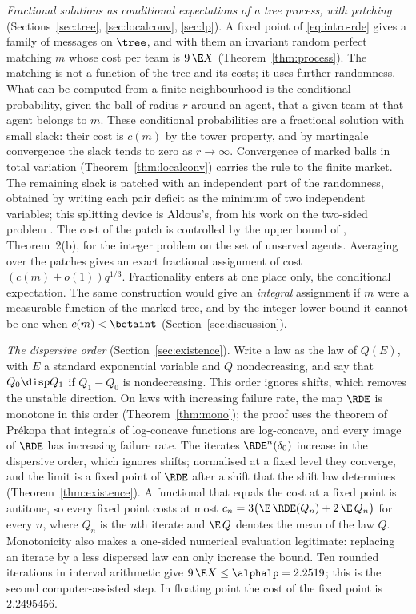 \emph{Fractional solutions as conditional expectations of a tree process, with patching}
(Sections~\ref{sec:tree}, \ref{sec:localconv}, \ref{sec:lp}). A fixed point of
\eqref{eq:intro-rde} gives a family of messages on $\tree$, and with them an invariant random
perfect matching $m$ whose cost per team is $9\,\E X$ (Theorem~\ref{thm:process}). The
matching is not a function of the tree and its costs; it uses further randomness. What can be
computed from a finite neighbourhood is the conditional probability, given the ball of radius
$r$ around an agent, that a given team at that agent belongs to $m$. These conditional
probabilities are a fractional solution with small slack: their cost is $c(m)$ by the tower
property, and by martingale convergence the slack tends to zero as $r\to\infty$. Convergence
of marked balls in total variation (Theorem~\ref{thm:localconv}) carries the rule to the
finite market. The remaining slack is patched with an independent part of the randomness,
obtained by writing each pair deficit as the minimum of two independent variables; this
splitting device is Aldous's, from his work on the two-sided problem
\cite{Aldous92,Aldous01}. The cost of the patch is controlled by the upper bound of
\cite{FPT20}, Theorem~2(b), for the integer problem on the set of unserved agents. Averaging
over the patches gives an exact fractional assignment of cost
$(c(m)+o(1))q^{1/3}$. Fractionality enters at one place only, the conditional expectation.
The same construction would give an \emph{integral} assignment if $m$ were a measurable
function of the marked tree, and by the integer lower bound it cannot be one when
$c(m)<\betaint$ (Section~\ref{sec:discussion}).

\emph{The dispersive order} (Section~\ref{sec:existence}). Write a law as the law of $Q(E)$,
with $E$ a standard exponential variable and $Q$ nondecreasing, and say that
$Q_0\disp Q_1$ if $Q_1-Q_0$ is nondecreasing. This order ignores shifts, which removes the
unstable direction. On laws with increasing failure rate, the map $\RDE$ is monotone in this
order (Theorem~\ref{thm:mono}); the proof uses the theorem of Pr\'ekopa \cite{Prekopa73} that
integrals of log-concave functions are log-concave, and every image of $\RDE$ has increasing
failure rate. The iterates $\RDE^n(\delta_0)$ increase in the dispersive order, which
ignores shifts; normalised at a fixed level they converge, and the limit is a fixed point of
$\RDE$ after a shift that the shift law determines (Theorem~\ref{thm:existence}). A functional that equals the cost at a fixed point is antitone, so every fixed
point costs at most $c_n=3\bigl(\E\,\RDE(Q_n)+2\,\E\,Q_n\bigr)$ for every $n$, where $Q_n$ is
the $n$th iterate and $\E\,Q$ denotes the mean of the law $Q$. Monotonicity also makes a
one-sided numerical evaluation legitimate: replacing an iterate by a less dispersed law can
only increase the bound. Ten rounded iterations in interval arithmetic give
$9\,\E X\le\alphalp=2.2519$; this is the second computer-assisted step. In floating point the
cost of the fixed point is $2.2495456$.

